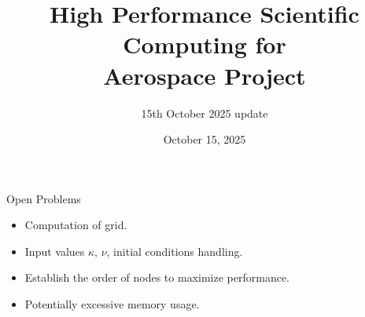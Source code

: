 \documentclass{beamer}
\title{High Performance Scientific Computing for \\ Aerospace Project}
\subtitle{15th October 2025 update}
\date{October 15, 2025}
\begin{document}
\begin{frame}
    \maketitle
\end{frame}


\begin{frame}{Open Problems}
    \begin{itemize}
        \item Computation of grid.
        \item Input values $\kappa$, $\nu$, initial conditions handling.
        \item Establish the order of nodes to maximize performance.
        \item Potentially excessive memory usage.
    \end{itemize}
\end{frame}
\end{document}
